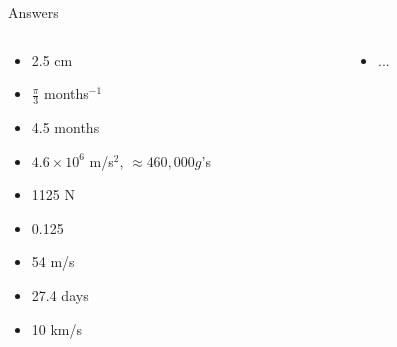 \documentclass{beamer}
\begin{document}
\begin{frame}{Answers}
\begin{columns}[T]
\begin{column}{0.5\textwidth}
\begin{itemize}
\item 2.5 cm
\item $\frac{\pi}{3}$ months$^{-1}$
\item 4.5 months
\item $4.6\times 10^6$ m/s$^2$, $\approx 460,000 g$'s
\item 1125 N
\item 0.125
\item 54 m/s
\item 27.4 days
\item 10 km/s
\end{itemize}
\end{column}
\begin{column}{0.5\textwidth}
\begin{itemize}
\item ... 
\end{itemize}
\end{column}
\end{columns}
\end{frame}
\end{document}
